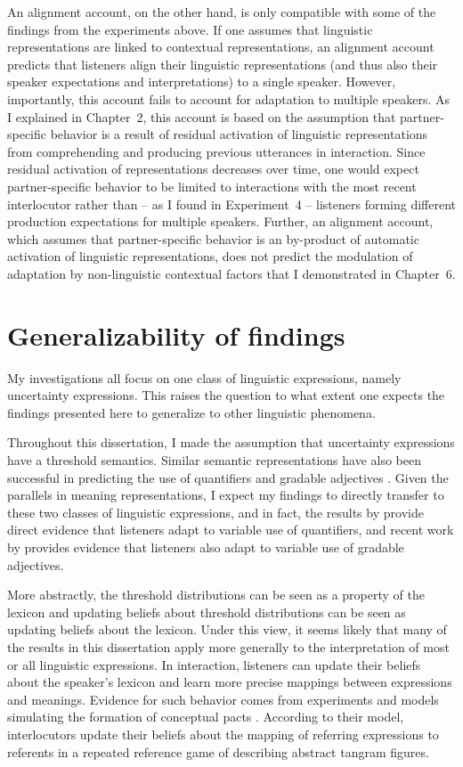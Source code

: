 An alignment account, on the other hand, is only compatible with some of the findings from the experiments above. If one assumes that linguistic representations are linked to contextual representations,  an alignment account predicts that listeners align their linguistic representations (and thus also their speaker expectations and interpretations) to a single speaker. However, importantly, this account fails to account for adaptation to multiple speakers. As I explained in Chapter~2, this account is based on the assumption that partner-specific behavior is a result of residual activation of linguistic representations from comprehending and producing previous utterances in interaction. Since residual activation  of representations decreases over time, one would expect partner-specific behavior to be limited to interactions with the most recent interlocutor rather than -- as I found in Experiment~4 -- listeners forming different production expectations for multiple speakers. Further, an alignment account, which assumes that partner-specific behavior is an by-product of automatic activation of linguistic representations, does not predict the modulation of adaptation by non-linguistic contextual factors that I demonstrated in Chapter~6. 

\section{Generalizability of findings}

My investigations all focus on one class of linguistic expressions, namely uncertainty expressions. This raises the question
to what extent one expects the findings presented here to generalize to other linguistic phenomena.

Throughout this dissertation, I made the assumption that uncertainty expressions have a threshold semantics. Similar semantic
representations have also been successful in predicting the use of quantifiers  and gradable adjectives . Given
the parallels in meaning representations, I expect my findings to directly transfer to these two classes of linguistic expressions, and in fact, 
the results by \textcite{Yildirim2016} provide direct evidence that listeners adapt to variable use of quantifiers, and recent work by \textcite{Xiang2020} 
provides evidence that listeners also adapt to variable use of gradable adjectives.

More abstractly, the threshold distributions can be seen as a property of the lexicon and updating beliefs about threshold distributions can be seen as
updating beliefs about the lexicon. Under this view, it seems likely that many of the results in this dissertation apply more generally to the interpretation of most or all linguistic expressions.
In interaction, listeners can update their beliefs about the speaker's lexicon and learn more precise mappings between expressions and meanings. Evidence for such behavior comes from  experiments and models simulating the formation of conceptual pacts \cite{Hawkins2017}. According to their model, interlocutors update their beliefs about the mapping of referring expressions
to referents in a repeated reference game of describing abstract tangram figures.

